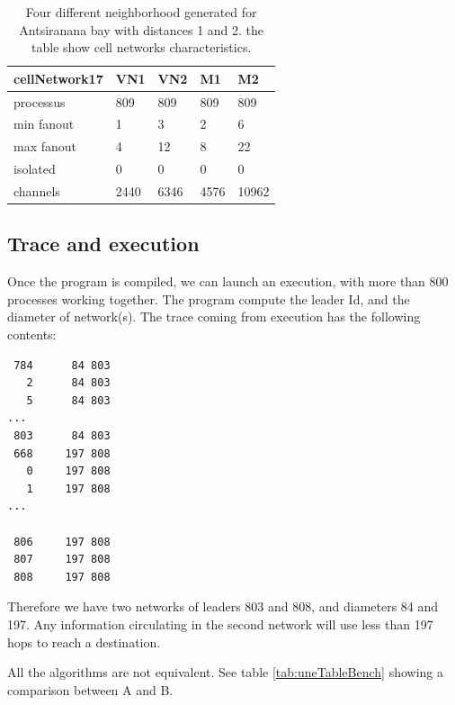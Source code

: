 \begin{table}[htb]
\begin{center}
\begin{tabular}{|l|l|ll|l||}\hline
cellNetwork17 & VN1 &   VN2 &   M1 &    M2\\\hline
processus  &    809 &   809 &   809 &   809\\\hline
min fanout  &   1 &     3 &     2 &     6\\\hline
max fanout  &   4 &     12 &    8 &     22\\\hline
isolated    &   0 &     0 &     0 &     0\\\hline
channels    &   2440 &  6346 &  4576 &  10962\\\hline
\end{tabular}
\caption{ Four different neighborhood generated for Antsiranana bay with distances 1 and 2.
the table show  cell  networks characteristics. }
\label{tab:uneCATable}
\end{center}
\end{table}


\subsection{ Trace and execution }

Once the program is compiled, we can launch an execution, with more than 800 processes
working together. The program compute the leader Id, and the diameter of network(s).
The trace coming from execution has the following contents:

\begin{lstlisting}
 784	  84 803
   2	  84 803
   5	  84 803
...
 803	  84 803
 668	 197 808
   0	 197 808
   1	 197 808
...

 806	 197 808
 807	 197 808
 808	 197 808
\end{lstlisting}

Therefore we have two networks of leaders 803 and 808, and diameters 84 and 197.
Any information circulating in the second network will use less than 197 hops to
reach a destination.

All the algorithms  are not equivalent. See table \ref{tab:uneTableBench} showing a comparison between A and B.

